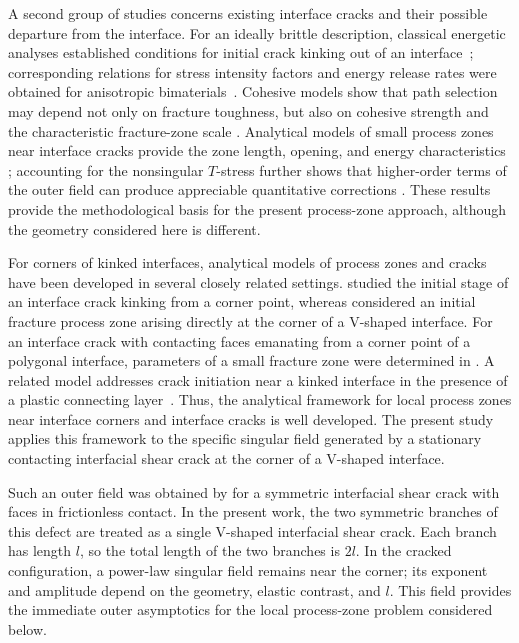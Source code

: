 \documentclass[pdflatex,iicol,sn-mathphys-ay]{sn-jnl}
\begin{document}
A second group of studies concerns existing interface cracks and their
possible departure from the interface. For an ideally brittle description,
classical energetic analyses established conditions for initial crack kinking
out of an interface~\citep{HeHutchinson1989}; corresponding relations for
stress intensity factors and energy release rates were obtained for
anisotropic bimaterials~\citep{Wang1994}. Cohesive models show that path
selection may depend not only on fracture toughness, but also on cohesive
strength and the characteristic fracture-zone scale
\citep{ParmigianiThouless2006}. Analytical models of small process zones near
interface cracks provide the zone length, opening, and energy characteristics
\citep{KaminskyEtAl2023}; accounting for the
nonsingular $T$-stress further shows that higher-order terms of the outer
field can produce appreciable quantitative corrections
\citep{KaminskyDudykChornoivan2026}. These results provide the methodological basis for the present process-zone
approach, although the geometry considered here is different.

For corners of kinked interfaces, analytical models of process zones and
cracks have been developed in several closely related settings.
\citet{DudykDikhtyarenko2012} studied the initial stage of an interface crack
kinking from a corner point, whereas \citet{KaminskyKipnisPolishchuk2012}
considered an initial fracture process zone arising directly at the corner of
a V-shaped interface. For an interface crack with contacting
faces emanating from a corner point of a polygonal interface, parameters of a
small fracture zone were determined in
\citep{KaminskyDudykFenkiv2023}. A related model addresses crack initiation near a kinked interface in the
presence of a plastic connecting layer~\citep{KaminskyDudykPolishchuk2024}. Thus, the analytical framework for local process zones near interface
corners and interface cracks is well developed. The present study applies
this framework to the specific singular field generated by a stationary
contacting interfacial shear crack at the corner of a V-shaped interface.

Such an outer field was obtained by \citet{NazarenkoKipnis2022Stress} for a
symmetric interfacial shear crack with faces in frictionless contact. In the present work, the two symmetric
branches of this defect are treated as a single V-shaped interfacial shear
crack. Each branch has length $l$, so the total length of the two branches is
$2l$. In the cracked configuration, a power-law singular field remains near
the corner; its exponent and amplitude depend on the geometry, elastic
contrast, and $l$. This field provides the immediate outer asymptotics for
the local process-zone problem considered below.
\end{document}
